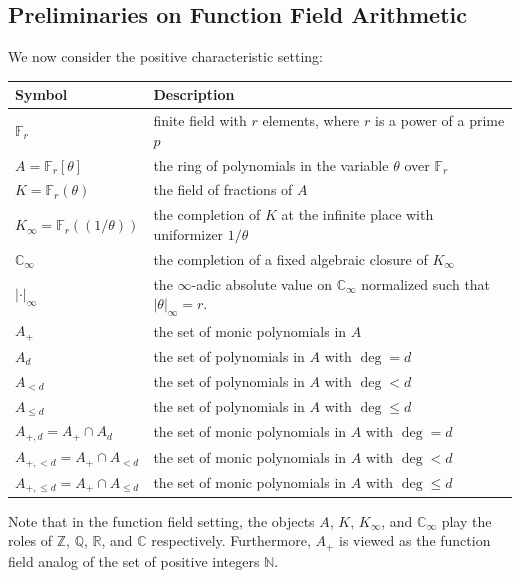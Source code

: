 \documentclass[12pt,reqno]{amsart}
\numberwithin{equation}{section}
\theoremstyle{plain}
\theoremstyle{definition}
\theoremstyle{remark}
\newcommand{\NN}{\mathbb{N}}
\newcommand{\CC}{\mathbb{C}}
\begin{document}
\subsection{Preliminaries on Function Field Arithmetic}
We now consider the positive characteristic setting: \vspace{0.2cm}\\
\noindent
\begin{tabularx}{\textwidth}{@{} l X @{}}
    \toprule
    \textbf{Symbol} & \textbf{Description} \\
    \midrule
    $\mathbb{F}_r$ & finite field with $r$ elements, where $r$ is a power of a prime $p$ \\
    $A = \mathbb{F}_r[\theta]$ & the ring of polynomials in the variable $\theta$ over $\mathbb{F}_r$ \\
    $K = \mathbb{F}_r(\theta)$ & the field of fractions  of $A$\\
    $K_\infty=\mathbb{F}_r((1/\theta))$ & the completion of $K$ at the infinite place with uniformizer $1/\theta$ \\
    $\mathbb{C}_\infty$ & the completion of a fixed algebraic closure of $K_\infty$ \\
    $| \cdot |_{\infty}$ & the $\infty$-adic absolute value on $\CC_\infty$ normalized such that $|\theta|_\infty=r$.  \\
    $A_+$ & the set of monic polynomials in $A$\\
    $A_{d}$& the set of polynomials in $A$ with $\deg=d$\\
    $A_{<d}$& the set of polynomials in $A$ with $\deg<d$\\
    $A_{\leq d}$& the set of polynomials in $A$ with $\deg\leq d$\\
    $A_{+,d}=A_+\cap A_d$ &the set of monic polynomials in $A$ with $\deg=d$\\
    $A_{+,<d}=A_+\cap A_{<d}$ &the set of monic polynomials in $A$ with $\deg<d$\\
    $A_{+,\leq d}=A_+\cap A_{\leq d}$ &the set of monic polynomials in $A$ with $\deg\leq d$\\
    \bottomrule
\end{tabularx}
\vspace{0.2cm}

Note that in the function field setting, the objects $A$, $K$, $K_\infty$, and $\mathbb{C}_\infty$ play the roles of $\mathbb{Z}$, $\mathbb{Q}$, $\mathbb{R}$, and $\mathbb{C}$ respectively. Furthermore, $A_+$ is viewed as the function field analog of the set of positive integers $\NN$.
\end{document}
